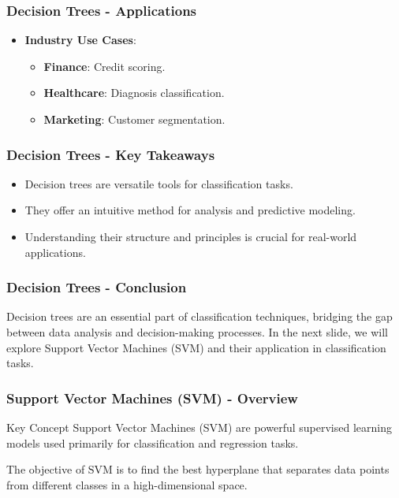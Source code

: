 \documentclass{beamer}
\begin{document}
\begin{frame}[fragile]
    \frametitle{Decision Trees - Applications}
    \begin{itemize}
        \item \textbf{Industry Use Cases}:
        \begin{itemize}
            \item \textbf{Finance}: Credit scoring.
            \item \textbf{Healthcare}: Diagnosis classification.
            \item \textbf{Marketing}: Customer segmentation.
        \end{itemize}
    \end{itemize}
\end{frame}

\begin{frame}[fragile]
    \frametitle{Decision Trees - Key Takeaways}
    \begin{itemize}
        \item Decision trees are versatile tools for classification tasks.
        \item They offer an intuitive method for analysis and predictive modeling.
        \item Understanding their structure and principles is crucial for real-world applications.
    \end{itemize}
\end{frame}

\begin{frame}[fragile]
    \frametitle{Decision Trees - Conclusion}
    Decision trees are an essential part of classification techniques, bridging the gap between data analysis and decision-making processes. In the next slide, we will explore Support Vector Machines (SVM) and their application in classification tasks.
\end{frame}

\begin{frame}[fragile]
    \frametitle{Support Vector Machines (SVM) - Overview}
    \begin{block}{Key Concept}
        Support Vector Machines (SVM) are powerful supervised learning models used primarily for classification and regression tasks. 
    \end{block}
    The objective of SVM is to find the best hyperplane that separates data points from different classes in a high-dimensional space.
\end{frame}
\end{document}

